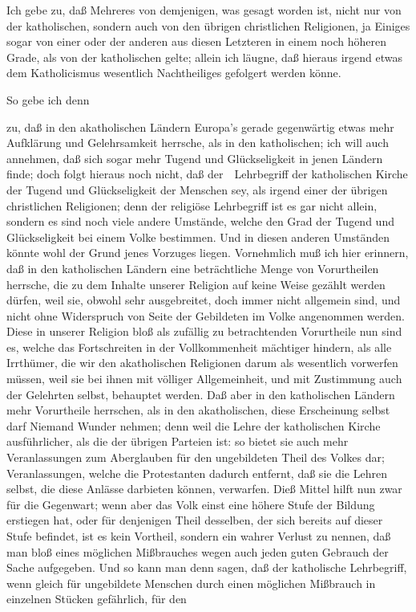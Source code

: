 \begin{aufza}
\end{aufza}

\begin{center}\end{center}

Ich gebe zu, daß Mehreres von demjenigen, was  gesagt worden ist, nicht nur von der katholischen, sondern auch von den übrigen christlichen Religionen, ja Einiges sogar von einer oder der anderen aus diesen Letzteren in einem noch höheren Grade, als von der katholischen gelte; allein ich läugne, daß hieraus irgend etwas dem Katholicismus wesentlich Nachtheiliges gefolgert werden könne.
\begin{aufza}
\item So gebe ich denn
\begin{aufzb}
\item zu, daß in den akatholischen Ländern Europa's gerade gegenwärtig etwas mehr Aufklärung und Gelehrsamkeit herrsche, als in den katholischen; ich will auch annehmen, daß sich sogar mehr Tugend und Glückseligkeit in jenen Ländern finde; doch folgt hieraus noch nicht, daß der~\ Lehrbegriff der katholischen Kirche der Tugend und Glückseligkeit der Menschen  sey, als irgend einer der übrigen christlichen Religionen; denn der religiöse Lehrbegriff ist es gar nicht allein, sondern es sind noch viele andere Umstände, welche den Grad der Tugend und Glückseligkeit bei einem Volke bestimmen. Und in diesen anderen Umständen könnte wohl der Grund jenes Vorzuges liegen. Vornehmlich muß ich hier erinnern, daß in den katholischen Ländern eine beträchtliche Menge von Vorurtheilen herrsche, die zu dem Inhalte unserer Religion auf keine Weise gezählt werden dürfen, weil sie, obwohl sehr ausgebreitet, doch immer nicht allgemein sind, und nicht ohne Widerspruch von Seite der Gebildeten im Volke angenommen werden. Diese in unserer Religion bloß als zufällig zu betrachtenden Vorurtheile nun sind es, welche das Fortschreiten in der Vollkommenheit mächtiger hindern, als alle Irrthümer, die wir den akatholischen Religionen darum als wesentlich vorwerfen müssen, weil sie bei ihnen mit völliger Allgemeinheit, und mit Zustimmung auch der Gelehrten selbst, behauptet werden. Daß aber in den katholischen Ländern mehr Vorurtheile herrschen, als in den akatholischen, diese Erscheinung selbst darf Niemand Wunder nehmen; denn weil die Lehre der katholischen Kirche ausführlicher, als die der übrigen Parteien ist: so bietet sie auch mehr Veranlassungen zum Aberglauben für den ungebildeten Theil des Volkes dar; Veranlassungen, welche die Protestanten dadurch entfernt, daß sie die Lehren selbst, die diese Anlässe darbieten können, verwarfen. Dieß Mittel hilft nun zwar für die Gegenwart; wenn aber das Volk einst eine höhere Stufe der Bildung erstiegen hat, oder für denjenigen Theil desselben, der sich bereits auf dieser Stufe befindet, ist es kein Vortheil, sondern ein wahrer Verlust zu nennen, daß man bloß eines möglichen Mißbrauches wegen auch jeden guten Gebrauch der Sache aufgegeben. Und so kann man denn sagen, daß der katholische Lehrbegriff, wenn gleich für ungebildete Menschen durch einen möglichen Mißbrauch in einzelnen Stücken gefährlich, für den 
\end{aufzb}
\end{aufza}
